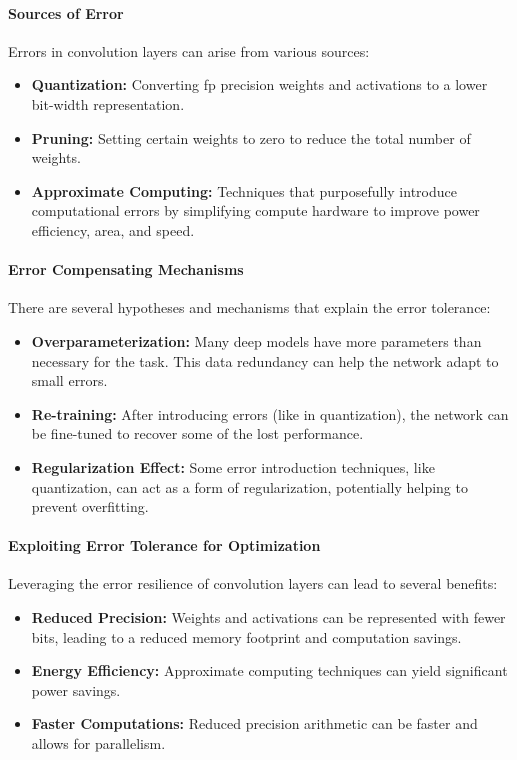 \paragraph{Sources of Error}

Errors in convolution layers can arise from various sources:
\begin{itemize}
	\item \textbf{Quantization:} Converting \gls{fp} precision weights and activations to a lower bit-width representation.
	\item \textbf{Pruning:} Setting certain weights to zero to reduce the total number of weights.
	\item \textbf{Approximate Computing:} Techniques that purposefully introduce computational errors by simplifying compute hardware to improve power efficiency, area, and speed.
\end{itemize}

\paragraph{Error Compensating Mechanisms}

There are several hypotheses and mechanisms that explain the error tolerance:

\begin{itemize}
	\item \textbf{Overparameterization:} Many deep models have more parameters than necessary for the task. This data redundancy can help the network adapt to small errors.
	\item \textbf{Re-training:} After introducing errors (like in quantization), the network can be fine-tuned to recover some of the lost performance.
	\item \textbf{Regularization Effect:} Some error introduction techniques, like quantization, can act as a form of regularization, potentially helping to prevent overfitting.
\end{itemize}

\paragraph{Exploiting Error Tolerance for Optimization}

Leveraging the error resilience of convolution layers can lead to several benefits:

\begin{itemize}
	\item \textbf{Reduced Precision:} Weights and activations can be represented with fewer bits, leading to a reduced memory footprint and computation savings.
	\item \textbf{Energy Efficiency:} Approximate computing techniques can yield significant power savings.
	\item \textbf{Faster Computations:} Reduced precision arithmetic can be faster and allows for parallelism.
\end{itemize}

